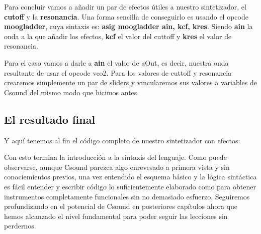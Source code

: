 Para concluir vamos a añadir un par de efectos útiles a nuestro sintetizador, el \textbf{cutoff} y la \textbf{resonancia}. Una forma sencilla de conseguirlo es usando el opcode \textbf{moogladder}, cuya sintaxis es: \textbf{asig moogladder ain, kcf, kres}. Siendo \textbf{ain} la onda a la que añadir los efectos, \textbf{kcf} el valor del cuttoff y \textbf{kres} el valor de resonancia.

Para el caso vamos a darle a \textbf{ain} el valor de aOut, es decir, nuestra onda resultante de usar el opcode vco2. Para los valores de cuttoff y resonancia crearemos simplemente un par de sliders y vincularemos sus valores a variables de Csound del mismo modo que hicimos antes.

\subsection{El resultado final}\label{sec:SinteCompleto}

Y aquí tenemos al fin el código completo de nuestro sintetizador con efectos:


Con esto termina la introducción a la sintaxis del lenguaje. Como puede observarse, aunque Csound parezca algo enrevesado a primera vista y sin conociemientos previos, una vez entendido el esquema básico y la lógica sintáctica es fácil entender y escribir código lo suficientemente elaborado como para obtener instrumentos completamente funcionales sin no demasiado esfuerzo.
Seguiremos profundizando en el potencial de Csound en posteriores capítulos ahora que hemos alcanzado el nivel fundamental para poder seguir las lecciones sin perdernos.
